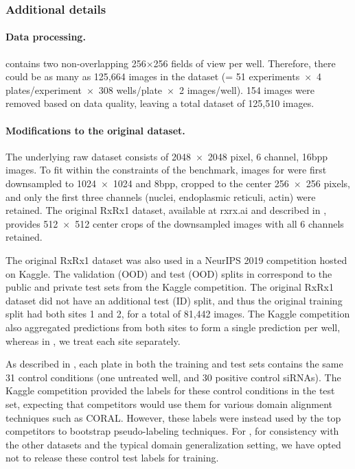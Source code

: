 \subsubsection{Additional details}\label{sec:app_rxrx1_details}
\paragraph{Data processing.}
\RxRx contains two non-overlapping 256$\times$256 fields of view per well.
Therefore, there could be as many as 125,664 images in the dataset (= 51 experiments~$\times$~4 plates/experiment~$\times$~308 wells/plate~$\times$~2 images/well).
154 images were removed based on data quality, leaving a total dataset of 125,510 images.

\paragraph{Modifications to the original dataset.} The underlying raw dataset
consists of 2048~$\times$~2048 pixel, 6 channel, 16bpp images. To fit within the
constraints of the \Wilds benchmark, images for \RxRx were first downsampled to
1024~$\times$~1024 and 8bpp, cropped to the center 256~$\times$~256 pixels, and only the
first three channels (nuclei, endoplasmic reticuli, actin) were retained. The
original RxRx1 dataset, available at rxrx.ai and described in \citet{taylor2019rxrx1}, provides 512~$\times$~512 center
crops of the downsampled images with all 6 channels retained.

The original RxRx1 dataset was also used in a NeurIPS 2019 competition hosted on Kaggle. The validation (OOD) and test (OOD) splits in \RxRx correspond to the public and private test sets from the Kaggle competition. The original RxRx1 dataset did not have an additional test (ID) split, and thus the original training split had both sites 1 and 2, for a total of 81,442 images.
The Kaggle competition also aggregated predictions from both sites to form a single prediction per well, whereas in \RxRx, we treat each site separately.

As described in , each plate in both the training and test sets contains the
same 31 control conditions (one untreated well, and 30 positive control siRNAs).
The Kaggle competition provided the labels for these control conditions in the test set, expecting that competitors would use them for various domain alignment techniques such as CORAL. However, these labels were instead used by the top competitors to bootstrap pseudo-labeling techniques.
For \RxRx, for consistency with the other datasets and the typical domain generalization setting, we have opted not to release these control test labels for training.

